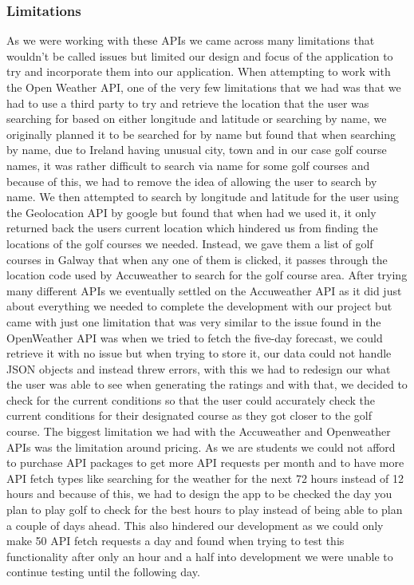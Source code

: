 \subsubsection{Limitations}
As we were working with these APIs we came across many limitations that wouldn't be called issues but limited our design and focus of the application to try and incorporate them into our application.
\newline
\newline
When attempting to work with the Open Weather API, one of the very few limitations that we had was that we had to use a third party to try and retrieve the location that the user was searching for based on either longitude and latitude or searching by name, we originally planned it to be searched for by name but found that when searching by name, due to Ireland having unusual city, town and in our case golf course names, it was rather difficult to search via name for some golf courses and because of this, we had to remove the idea of allowing the user to search by name.
\newline
\newline
We then attempted to search by longitude and latitude for the user using the Geolocation API by google but found that when had we used it, it only returned back the users current location which hindered us from finding the locations of the golf courses we needed. Instead, we gave them a list of golf courses in Galway that when any one of them is clicked, it passes through the location code used by Accuweather to search for the golf course area.
\newline
\newline
After trying many different APIs we eventually settled on the Accuweather API as it did just about everything we needed to complete the development with our project but came with just one limitation that was very similar to the issue found in the OpenWeather API was when we tried to fetch the five-day forecast, we could retrieve it with no issue but when trying to store it, our data could not handle JSON objects and instead threw errors, with this we had to redesign our what the user was able to see when generating the ratings and with that, we decided to check for the current conditions so that the user could accurately check the current conditions for their designated course as they got closer to the golf course.\cite{ref14}
\newline
\newline
The biggest limitation we had with the Accuweather and Openweather APIs was the limitation around pricing. As we are students we could not afford to purchase API packages to get more API requests per month and to have more API fetch types like searching for the weather for the next 72 hours instead of 12 hours and because of this, we had to design the app to be checked the day you plan to play golf to check for the best hours to play instead of being able to plan a couple of days ahead.\cite{ref14}\cite{ref16}
\newline
\newline
This also hindered our development as we could only make 50 API fetch requests a day and found when trying to test this functionality after only an hour and a half into development we were unable to continue testing until the following day.
